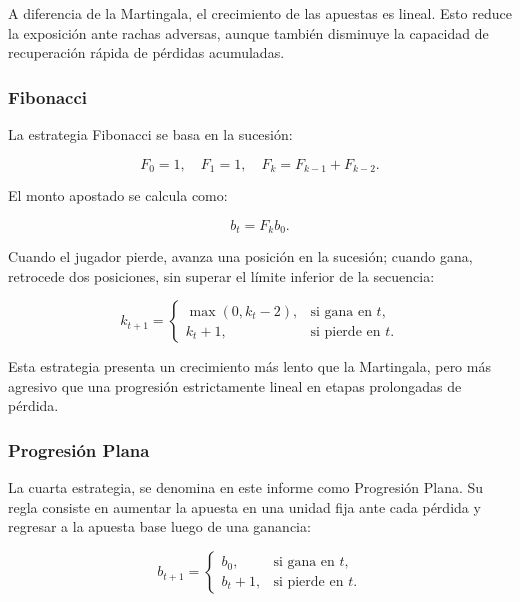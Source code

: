\documentclass{article}
\begin{document}
A diferencia de la Martingala, el crecimiento de las apuestas es lineal. Esto reduce la exposición ante rachas adversas, aunque también disminuye la capacidad de recuperación rápida de pérdidas acumuladas.

\subsubsection{Fibonacci}

La estrategia Fibonacci se basa en la sucesión:

\begin{equation}
    F_0=1,\quad F_1=1,\quad F_k=F_{k-1}+F_{k-2}.
\end{equation}

El monto apostado se calcula como:

\begin{equation}
    b_t=F_k b_0.
\end{equation}

Cuando el jugador pierde, avanza una posición en la sucesión; cuando gana, retrocede dos posiciones, sin superar el límite inferior de la secuencia:

\begin{equation}
    k_{t+1} =
    \begin{cases}
    \max(0,k_t-2), & \text{si gana en } t,\\
    k_t+1, & \text{si pierde en } t.
    \end{cases}
\end{equation}

Esta estrategia presenta un crecimiento más lento que la Martingala, pero más agresivo que una progresión estrictamente lineal en etapas prolongadas de pérdida.

\subsubsection{Progresión Plana}

La cuarta estrategia, se denomina en este informe como Progresión Plana. Su regla consiste en aumentar la apuesta en una unidad fija ante cada pérdida y regresar a la apuesta base luego de una ganancia:

\begin{equation}
    b_{t+1} =
    \begin{cases}
    b_0, & \text{si gana en } t,\\
    b_t+1, & \text{si pierde en } t.
    \end{cases}
\end{equation}
\end{document}
